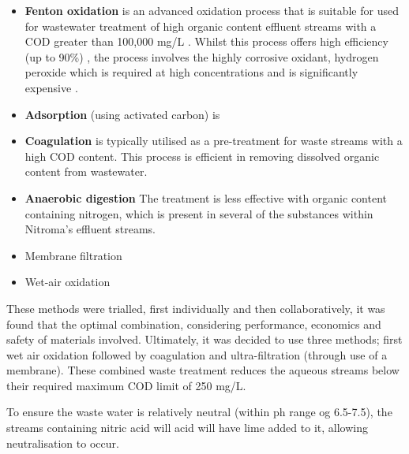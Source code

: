 \begin{itemize}

    \item \textbf{Fenton oxidation} is an advanced oxidation process that is suitable for used for wastewater treatment of high organic content effluent streams with a COD greater than 100,000 mg/L \cite{hakika_decreasing_2019}. Whilst this process offers high efficiency (up to 90\%) \cite{afzal_removal_2018}, the process involves the highly corrosive oxidant, hydrogen peroxide which is required at high concentrations and is significantly expensive \cite{xu_advancements_2020}. 
    
    
    \item \textbf{Adsorption} (using activated carbon) is
    
    
  
    
    
    \item \textbf{Coagulation }is typically utilised as a pre-treatment for waste streams with a high COD content. This process is efficient in removing dissolved organic content from wastewater. 
    
    \item \textbf{Anaerobic digestion} The treatment is less effective with organic content containing nitrogen, which is present in several of the substances within Nitroma's effluent streams. 

    \item Membrane filtration
    
    
    \item Wet-air oxidation 
    
    
    
\end{itemize}
These methods were trialled, first individually and then collaboratively, it was found that the optimal combination, considering performance, economics and safety of materials involved. Ultimately, it was decided to use three methods; first wet air oxidation followed by coagulation and ultra-filtration (through use of a membrane). These combined waste treatment reduces the aqueous streams below their required maximum COD limit of 250 mg/L. 

To ensure the waste water is relatively neutral (within ph range og 6.5-7.5), the streams containing nitric acid will acid will have lime added to it, allowing neutralisation to occur. 



